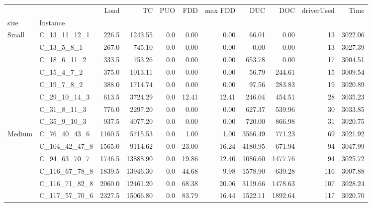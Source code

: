 \begin{tabular}{llrrrrrrrrr}
\toprule
      &                 &    Load &        TC &  PUO &      FDD &  max FDD &      DUC &      DOC &  driverUsed &     Time \\
size & Instance &         &           &      &          &          &          &          &             &          \\
\midrule
Small & C\_13\_11\_12\_1 &   226.5 &   1243.55 &  0.0 &     0.00 &     0.00 &    66.01 &     0.00 &          13 &  3022.06 \\
      & C\_13\_5\_8\_1 &   267.0 &    745.10 &  0.0 &     0.00 &     0.00 &     0.00 &     0.00 &          13 &  3027.39 \\
      & C\_18\_6\_11\_2 &   333.5 &    753.26 &  0.0 &     0.00 &     0.00 &   653.78 &     0.00 &          17 &  3004.51 \\
      & C\_15\_4\_7\_2 &   375.0 &   1013.11 &  0.0 &     0.00 &     0.00 &    56.79 &   244.61 &          15 &  3009.54 \\
      & C\_19\_7\_8\_2 &   388.0 &   1714.74 &  0.0 &     0.00 &     0.00 &    97.56 &   283.83 &          19 &  3020.89 \\
      & C\_29\_10\_14\_3 &   613.5 &   3724.29 &  0.0 &    12.41 &    12.41 &   246.04 &   454.51 &          28 &  3035.23 \\
      & C\_31\_8\_11\_3 &   776.0 &   2297.20 &  0.0 &     0.00 &     0.00 &   627.37 &   539.96 &          30 &  3033.85 \\
      & C\_35\_9\_10\_3 &   937.5 &   4077.20 &  0.0 &     0.00 &     0.00 &   720.00 &   866.98 &          31 &  3020.75 \\
Medium & C\_76\_40\_43\_6 &  1160.5 &   5715.53 &  0.0 &     1.00 &     1.00 &  3566.49 &   771.23 &          69 &  3021.92 \\
      & C\_104\_42\_47\_8 &  1565.0 &   9114.62 &  0.0 &    23.00 &    16.24 &  4180.95 &   671.94 &          94 &  3047.99 \\
      & C\_94\_63\_70\_7 &  1746.5 &  13888.90 &  0.0 &    19.86 &    12.40 &  1086.60 &  1477.76 &          94 &  3025.72 \\
      & C\_116\_67\_78\_8 &  1839.5 &  13946.30 &  0.0 &    44.68 &     9.98 &  1578.90 &   639.28 &         116 &  3007.88 \\
      & C\_116\_71\_82\_8 &  2060.0 &  12461.20 &  0.0 &    68.38 &    20.06 &  3119.66 &  1478.63 &         107 &  3028.24 \\
      & C\_117\_57\_70\_6 &  2327.5 &  15066.80 &  0.0 &    83.79 &    16.44 &  1522.11 &  1892.64 &         117 &  3020.70 \\

\end{tabular}
